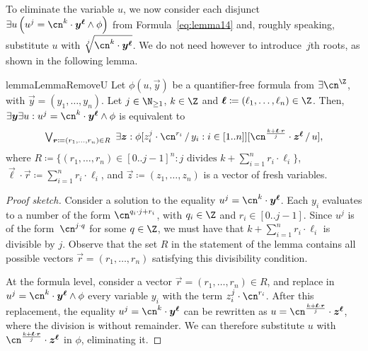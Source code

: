 To eliminate the variable $u$, we now 
consider each disjunct $\exists u \left( u^{j} = \cn^{k} \cdot \vec{y}^{\vec \ell}
\land \phi \right)$ from Formula~\eqref{eq:lemma14} and, roughly speaking, 
substitute $u$ with $\sqrt[j]{\cn^{k} \cdot \vec{y}^{\vec{\ell}}}$. 
We do not need however to introduce~$j$th roots, as shown in the following lemma. 


\begin{restatable}{lemma}{LemmaRemoveU}
  \label{lemma:remove-u}
  Let $\phi(u,\vec y)$ be a quantifier-free formula from $\exists \ipow{\cn}$,
  with $\vec y = (y_1,\dots,y_n)$. Let $j \in \N_{\geq 1}$, $k \in \Z$ and
  $\vec{\ell} \coloneqq (\ell_1,\dots,\ell_n) \in \Z$. Then,
  $\exists \vec{y} \exists u : u^{j} = \cn^{k} \cdot \vec y^{\vec \ell} \land
  \phi$ is equivalent to
  \begin{equation*}
    \textstyle\bigvee_{\vec r \coloneqq (r_1,\dots,r_n) \in R}\
    \exists \vec z : \phi\sub{z_i^j \cdot \cn^{r_i}}{y_i : i \in [1..n]}\sub{\cn^{\frac{k + \vec \ell \cdot \vec r}{j}} \cdot \vec z^{\vec \ell}}{u},
  \end{equation*}
  where $R \coloneqq \big\{(r_1,\dots,r_n)\in[0..j-1]^n : j \text{ divides } k +
  \sum_{i=1}^n r_i \cdot \ell_i \big\}$, $\vec \ell \cdot \vec r \coloneqq
  \sum_{i=1}^n r_i \cdot \ell_i$, and $\vec z \coloneqq (z_1,\dots,z_n)$ is a
  vector of fresh variables.
\end{restatable}

\begin{proof}[Proof sketch]
  Consider a solution to the equality $u^{j} = \cn^{k} \cdot
  \vec{y}^{\vec{\ell}}$. Each $y_i$ evaluates to a number of the form $\cn^{q_i
  \cdot j + r_i}$, with $q_i \in \Z$ and $r_i \in [0..j-1]$. Since $u^{j}$ is of
  the form~$\cn^{j \cdot q}$ for some $q \in \Z$, we must have that $k +
  \sum_{i=1}^n r_i \cdot \ell_i$ is divisible by $j$. Observe that the set $R$
  in the statement of the lemma contains all possible vectors $\vec r =
  (r_1,\dots,r_n)$ satisfying this divisibility condition.
  
  At the formula level, consider a vector $\vec r = (r_1,\dots,r_n) \in R$,
  and replace in ${u^{j} = \cn^{k} \cdot \vec{y}^{\vec{\ell}} \land \phi}$
  every variable $y_i$ with the term $z_i^{j} \cdot
  \cn^{r_i}$. After this replacement, the equality $u^{j} = \cn^{k} \cdot \vec{y}^{\vec{\ell}}$ can be rewritten as 
  $u = \cn^{\frac{k + \vec \ell \cdot \vec r}{j}} \cdot \vec z^{\vec \ell}$, 
  where the division is without remainder. 
  We can therefore substitute $u$ with $\cn^{\frac{k + \vec \ell \cdot \vec r}{j}} \cdot \vec z^{\vec \ell}$ in $\phi$, eliminating it.
\end{proof}

